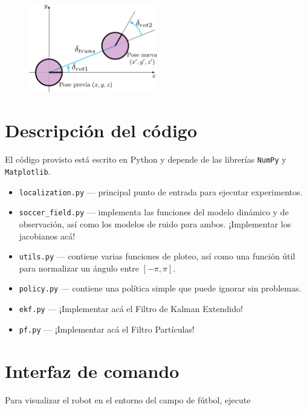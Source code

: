 \documentclass[tp]{lcc}
\begin{document}
	\begin{figure}[!htbp]
		\centering
		\includegraphics[width=0.5\textwidth]{./images/odometry_as_controls.pdf}
		\label{fig:odometry-base-motion-model}
	\end{figure}

	\section{Descripción del código}
	
	El código provisto está escrito en Python y depende de las librerías \lstinline[style=bash]{NumPy} y \lstinline[style=bash]{Matplotlib}.
	
	\begin{itemize}
		\item \lstinline[style=bash]{localization.py} --- principal punto de entrada para ejecutar experimentos.
		\item \lstinline[style=bash]{soccer_field.py} --- implementa las funciones del modelo dinámico y de observación, así como los modelos de ruido para ambos. ¡Implementar los jacobianos acá!
		\item \lstinline[style=bash]{utils.py} --- contiene varias funciones de ploteo, así como una función útil para normalizar un ángulo entre $[-\pi, \pi]$.
		\item \lstinline[style=bash]{policy.py} --- contiene una política simple que puede ignorar sin problemas.
		\item \lstinline[style=bash]{ekf.py} --- ¡Implementar acá el Filtro de Kalman Extendido!
		\item \lstinline[style=bash]{pf.py} --- ¡Implementar acá el Filtro Partículas!
	\end{itemize}

	\section{Interfaz de comando}

	Para visualizar el robot en el entorno del campo de fútbol, ejecute
\end{document}

